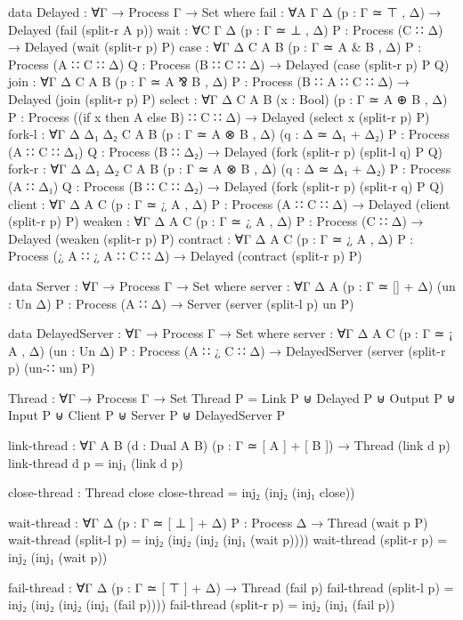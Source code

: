 \begin{code}
data Delayed : ∀{Γ} → Process Γ → Set where
  fail :
    ∀{A Γ Δ}
    (p : Γ ≃ ⊤ , Δ) → Delayed (fail (split-r {A} p))
  wait :
    ∀{C Γ Δ} (p : Γ ≃ ⊥ , Δ) {P : Process (C ∷ Δ)} → Delayed (wait (split-r p) P)
  case :
    ∀{Γ Δ C A B} (p : Γ ≃ A & B , Δ) {P : Process (A ∷ C ∷ Δ)} {Q : Process (B ∷ C ∷ Δ)} →
    Delayed (case (split-r p) P Q)
  join :
    ∀{Γ Δ C A B} (p : Γ ≃ A ⅋ B , Δ) {P : Process (B ∷ A ∷ C ∷ Δ)} →
    Delayed (join (split-r p) P)
  select :
    ∀{Γ Δ C A B} (x : Bool) (p : Γ ≃ A ⊕ B , Δ) {P : Process ((if x then A else B) ∷ C ∷ Δ)} →
    Delayed (select x (split-r p) P)
  fork-l :
    ∀{Γ Δ Δ₁ Δ₂ C A B} (p : Γ ≃ A ⊗ B , Δ) (q : Δ ≃ Δ₁ + Δ₂)
    {P : Process (A ∷ C ∷ Δ₁)} {Q : Process (B ∷ Δ₂)} →
    Delayed (fork (split-r p) (split-l q) P Q)
  fork-r :
    ∀{Γ Δ Δ₁ Δ₂ C A B} (p : Γ ≃ A ⊗ B , Δ) (q : Δ ≃ Δ₁ + Δ₂)
    {P : Process (A ∷ Δ₁)} {Q : Process (B ∷ C ∷ Δ₂)} →
    Delayed (fork (split-r p) (split-r q) P Q)
  client :
    ∀{Γ Δ A C} (p : Γ ≃ ¿ A , Δ) {P : Process (A ∷ C ∷ Δ)} →
    Delayed (client (split-r p) P)
  weaken :
    ∀{Γ Δ A C} (p : Γ ≃ ¿ A , Δ) {P : Process (C ∷ Δ)} →
    Delayed (weaken (split-r p) P)
  contract :
    ∀{Γ Δ A C} (p : Γ ≃ ¿ A , Δ) {P : Process (¿ A ∷ ¿ A ∷ C ∷ Δ)} →
    Delayed (contract (split-r p) P)

data Server : ∀{Γ} → Process Γ → Set where
  server :
    ∀{Γ Δ A} (p : Γ ≃ [] + Δ) (un : Un Δ) {P : Process (A ∷ Δ)} →
    Server (server (split-l p) un P)

data DelayedServer : ∀{Γ} → Process Γ → Set where
  server :
    ∀{Γ Δ A C} (p : Γ ≃ ¡ A , Δ) (un : Un Δ) {P : Process (A ∷ ¿ C ∷ Δ)} →
    DelayedServer (server (split-r p) (un-∷ un) P)

Thread : ∀{Γ} → Process Γ → Set
Thread P = Link P ⊎ Delayed P ⊎ Output P ⊎ Input P ⊎ Client P ⊎ Server P ⊎ DelayedServer P

link-thread : ∀{Γ A B} (d : Dual A B) (p : Γ ≃ [ A ] + [ B ]) → Thread (link d p)
link-thread d p = inj₁ (link d p)

close-thread : Thread close
close-thread = inj₂ (inj₂ (inj₁ close))

wait-thread : ∀{Γ Δ} (p : Γ ≃ [ ⊥ ] + Δ) {P : Process Δ} → Thread (wait p P)
wait-thread (split-l p) = inj₂ (inj₂ (inj₂ (inj₁ (wait p))))
wait-thread (split-r p) = inj₂ (inj₁ (wait p))

fail-thread : ∀{Γ Δ} (p : Γ ≃ [ ⊤ ] + Δ) → Thread (fail p)
fail-thread (split-l p) = inj₂ (inj₂ (inj₂ (inj₁ (fail p))))
fail-thread (split-r p) = inj₂ (inj₁ (fail p))


\end{code}
